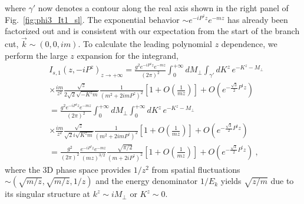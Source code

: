 \documentclass[a4paper,11pt]{article}
\begin{document}
where $\gamma'$ now denotes a contour along the real axis shown in the right panel of Fig.~\ref{fig:phi3_It1_sl}. The exponential behavior $\sim e^{-i P^z z} e^{-m z}$ has already been factorized out and is consistent with our expectation from the start of the branch cut, $\vec{k}\sim (0,0,im)$. To calculate the leading polynomial $z$ dependence, we perform the large $z$ expansion for the integrand,
\begin{align}\label{eq:Is1spacelike}
&I_{s,1}\left(z, -i P^z\right)_{z\rightarrow +\infty}
= \frac{g^2 e^{-i P^z z} e^{-m z}}{(2\pi)^2} \int_{0}^{+\infty} d M_{\perp} \int_{\gamma'} d K^z \, e^{-K^z-M_{\perp}} \nonumber\\
&\times \frac{i m}{z^2} \frac{\sqrt{z}}{2 \sqrt{2} \sqrt{-K^z m}} \frac{1}{\left(m^2+2 i m P^z\right)^2} \left[1+O\left(\frac{1}{m z}\right)\right] + O\left(e^{-\frac{\sqrt{3}}{2}P^t z}\right) \nonumber\\
&= \frac{g^2 e^{-i P^z z} e^{-m z}}{(2\pi)^2} \int_{0}^{+\infty} d M_{\perp} \int_{0}^{+\infty} d K^z \, e^{-K^z-M_{\perp}} \nonumber\\
&\times \frac{i m}{z^2} \frac{\sqrt{z}}{\sqrt{2} i \sqrt{K^z m}} \frac{1}{\left(m^2+2 i m P^z\right)^2} \left[1+O\left(\frac{1}{m z}\right)\right] + O\left(e^{-\frac{\sqrt{3}}{2}P^t z}\right) \nonumber\\
&= \frac{g^2}{(2\pi)^2} \frac{e^{-i P^z z} e^{-m z}}{(m z)^{3/2}} \frac{\sqrt{\pi/2}}{\left(m+2 i P^z\right)^2} \left[1+O\left(\frac{1}{m z}\right)\right] + O\left(e^{-\frac{\sqrt{3}}{2}P^t z}\right) \ ,
\end{align}
where the 3D phase space provides $1/z^2$ from spatial fluctuations $\sim \left(\sqrt{m/z},\sqrt{m/z},1/z\right)$ and the energy denominator $1/E_k$ yields $\sqrt{z/m}$ due to its singular structure at $k^z \sim i M_{\perp}$ or $K^z \sim 0$. 
\end{document}
